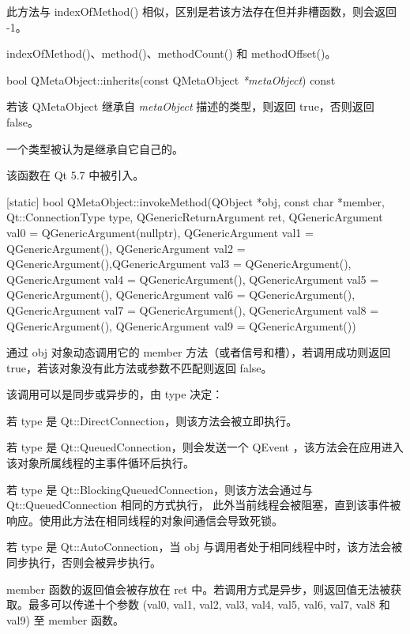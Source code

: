 此方法与 indexOfMethod() 相似，区别是若该方法存在但并非槽函数，则会返回 -1。

\begin{notice}[另请参阅]
indexOfMethod()、method()、methodCount() 和 methodOffset()。
\end{notice}


bool QMetaObject::inherits(const QMetaObject \emph{*metaObject}) const

若该 QMetaObject 继承自 \emph{metaObject} 描述的类型，则返回 true，否则返回 false。

一个类型被认为是继承自它自己的。

该函数在 Qt 5.7 中被引入。

[static] bool QMetaObject::invokeMethod(QObject *obj, const char *member, 
 Qt::ConnectionType type, QGenericReturnArgument ret, 
 QGenericArgument val0 = QGenericArgument(nullptr), QGenericArgument val1 = QGenericArgument(), 
 QGenericArgument val2 = QGenericArgument(),QGenericArgument val3 = QGenericArgument(), 
 QGenericArgument val4 = QGenericArgument(), QGenericArgument val5 = QGenericArgument(), 
 QGenericArgument val6 = QGenericArgument(), QGenericArgument val7 = QGenericArgument(), 
 QGenericArgument val8 = QGenericArgument(), QGenericArgument val9 = QGenericArgument())

通过 obj 对象动态调用它的 member 方法（或者信号和槽），若调用成功则返回 true，若该对象没有此方法或参数不匹配则返回 false。

该调用可以是同步或异步的，由 type 决定：

\begin{compactitem}
\item 若 type 是 Qt::DirectConnection，则该方法会被立即执行。
\item 若 type 是 Qt::QueuedConnection，则会发送一个 QEvent ，该方法会在应用进入该对象所属线程的主事件循环后执行。
\item 若 type 是 Qt::BlockingQueuedConnection，则该方法会通过与 Qt::QueuedConnection 相同的方式执行，
	此外当前线程会被阻塞，直到该事件被响应。使用此方法在相同线程的对象间通信会导致死锁。
\item 若 type 是 Qt::AutoConnection，当 obj 与调用者处于相同线程中时，该方法会被同步执行，否则会被异步执行。
\end{compactitem}

member 函数的返回值会被存放在 ret 中。若调用方式是异步，则返回值无法被获取。最多可以传递十个参数 (val0, val1, val2, val3, val4, val5, val6, val7, val8 和 val9) 至 member 函数。

